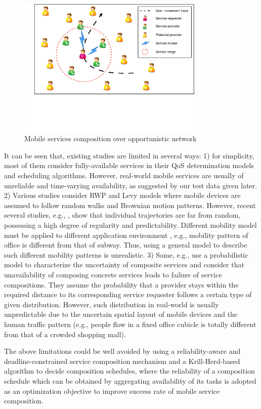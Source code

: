 \documentclass[journal]{IEEEtran}
\begin{document}
\begin{figure}[!t]
\centering
\includegraphics[width=3.5in]{./img/pic2.pdf}
\caption{Mobile services composition over opportunistic network}
\label{fig_MSCON}
\end{figure}

It can be seen that, existing studies are limited in several ways: 
1) for simplicity, most of them consider fully-available services in their QoS determination models and scheduling algorithms. However, real-world mobile services are usually of unreliable and time-varying availability, as suggested by our test data given later.
2) Various studies consider RWP and Levy models where mobile devices are assumed to follow random walks and Brownian motion patterns. However, recent several studies, e.g., \cite{barbosa2017human, bettstetter2003node, navidi2004improving}, show that individual trajectories are far from random, possessing a high degree of regularity and predictability. Different mobility model must be applied to different application environment \cite{camp2002survey}, e.g., mobility pattern of office is different from that of subway. Thus, using a general model to describe such different mobility patterns is unrealistic.
3) Some, e.g., \cite{wang2011exploiting, Deng2016-2} use a probabilistic model to characterize the uncertainty of composite services and consider that unavailability of composing concrete services leads to failure of service compositions.
They assume the probability that a provider stays within the required distance to its corresponding service requester follows a certain type of given distribution. However, such distribution in real-world is usually unpredictable due to the uncertain spatial layout of mobile devices and the human traffic pattern (e.g., people flow in a fixed office cubicle is totally different from that of a crowded shopping mall). 

The above limitations could be well avoided by using a reliability-aware and deadline-constrained service composition mechanism and a Krill-Herd-based algorithm to decide composition schedules, where the reliability of a composition schedule which can be obtained by aggregating availability of its tasks is adopted as an optimization objective to improve success rate of mobile service composition.
\end{document}
